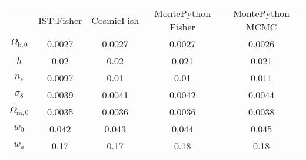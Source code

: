 \begin{table}
\centering
\begin{tabular}{|c|c|c|c|c|}
 & IST:Fisher & CosmicFish & MontePython Fisher & MontePython MCMC \\
$\Omega_{\mathrm{b},0}$ & 0.0027 & 0.0027 & 0.0027 & 0.0026 \\
$h$ & 0.02 & 0.02 & 0.021 & 0.021 \\
$n_s$ & 0.0097 & 0.01 & 0.01 & 0.011 \\
$\sigma_8$ & 0.0039 & 0.0041 & 0.0042 & 0.0044 \\
$\Omega_{\mathrm{m},0}$ & 0.0035 & 0.0036 & 0.0036 & 0.0038 \\
$w_0$ & 0.042 & 0.043 & 0.044 & 0.045 \\
$w_a$ & 0.17 & 0.17 & 0.18 & 0.18 \\
\end{tabular}
\end{table}
